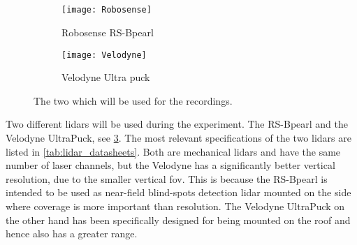 \subsection{}
\begin{figure}[htbp]
    \centering
    \begin{subfigure}{0.4\textwidth}
        \centering
        \texttt{[image: Robosense]}
        \caption{Robosense RS-Bpearl~\cite{RoboSense2020}}
        \label{fig:lidar_robosense}
    \end{subfigure}
    \begin{subfigure}{0.4\textwidth}
        \centering
        \texttt{[image: Velodyne]}
        \caption{Velodyne Ultra puck~\cite{Velodyne2018}}
        \label{fig:lidar_velodyne}
    \end{subfigure}
    \caption[ used in the experiment]{The two  which will be used for the recordings.}
    \label{fig:lidars_used}
\end{figure}
Two different \glspl{lidar} will be used during the experiment.
The RS-Bpearl and the Velodyne UltraPuck, see \cref{fig:lidars_used}.
The most relevant specifications of the two \glspl{lidar} are listed in \cref{tab:lidar_datasheets}.
Both are mechanical \glspl{lidar} and have the same number of laser channels, but the Velodyne has a significantly better vertical resolution, due to the smaller vertical \gls{fov}.
This is because the RS-Bpearl is intended to be used as near-field blind-spots detection \gls{lidar} mounted on the side where coverage is more important than resolution.
The Velodyne UltraPuck on the other hand has been specifically designed for being mounted on the roof and hence also has a greater range.

